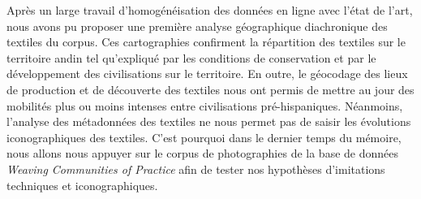 Après un large travail d'homogénéisation des données en ligne avec l'état de l'art, nous avons pu proposer une première analyse géographique diachronique des textiles du corpus. Ces cartographies confirment la répartition des textiles sur le territoire andin tel qu'expliqué par les conditions de conservation et par le développement des civilisations sur le territoire. En outre, le géocodage des lieux de production et de découverte des textiles nous ont permis de mettre au jour des mobilités plus ou moins intenses entre civilisations pré-hispaniques. Néanmoins, l'analyse des métadonnées des textiles ne nous permet pas de saisir les évolutions iconographiques des textiles. C'est pourquoi dans le dernier temps du mémoire, nous allons nous appuyer sur le corpus de photographies de la base de données \textit{Weaving Communities of Practice} afin de tester nos hypothèses d'imitations techniques et iconographiques.